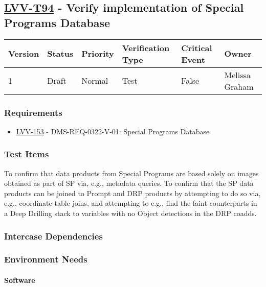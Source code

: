 \subsection{\href{https://jira.lsstcorp.org/secure/Tests.jspa\#/testCase/LVV-T94}{LVV-T94}
    - Verify implementation of Special Programs Database}\label{lvv-t94}

\begin{longtable}[]{llllll}
\toprule
Version & Status & Priority & Verification Type & Critical Event & Owner
\\\midrule
1 & Draft & Normal &
Test & False & Melissa Graham
\\\bottomrule
\end{longtable}

\subsubsection{Requirements}
\begin{itemize}
\item \href{https://jira.lsstcorp.org/browse/LVV-153}{LVV-153} - DMS-REQ-0322-V-01: Special Programs Database
\end{itemize}

\subsubsection{Test Items}
To confirm that data products from Special Programs are based solely on
images obtained as part of SP via, e.g., metadata queries. To confirm
that the SP data products can be joined to Prompt and DRP products by
attempting to do so via, e.g., coordinate table joins, and attempting to
e.g., find the faint counterparts in a Deep Drilling stack to variables
with no Object detections in the DRP coadds.



\subsubsection{Intercase Dependencies}

\subsubsection{Environment Needs}

\paragraph{Software}

